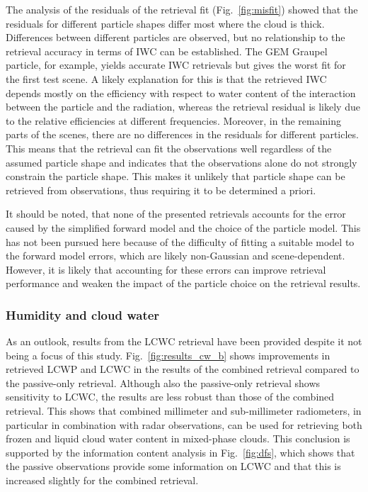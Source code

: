 \documentclass[journal abbreviation, manuscript]{copernicus}
\begin{document}
The analysis of the residuals of the retrieval fit (Fig.~\ref{fig:misfit})
showed that the residuals for different particle shapes differ most where the
cloud is thick. Differences between different particles are observed, but no
relationship to the retrieval accuracy in terms of IWC can be established. The
GEM Graupel particle, for example, yields accurate IWC retrievals but gives the
worst fit for the first test scene. A likely explanation for this is that the
retrieved IWC depends mostly on the efficiency with respect to water content of
the interaction between the particle and the radiation, whereas the retrieval
residual is likely due to the relative efficiencies at different frequencies.
Moreover, in the remaining parts of the scenes, there are no differences in the
residuals for different particles. This means that the retrieval can fit the
observations well regardless of the assumed particle shape and indicates that
the observations alone do not strongly constrain the particle shape. This 
makes it unlikely that particle shape can be retrieved from observations,
thus requiring it to be determined a priori.

It should be noted, that none of the presented retrievals accounts for the error
caused by the simplified forward model and the choice of the particle model.
This has not been pursued here because of the difficulty of fitting a suitable
model to the forward model errors, which are likely non-Gaussian and
scene-dependent. However, it is likely that accounting for these errors can
improve retrieval performance and weaken the impact of the particle choice on
the retrieval results.

\subsubsection{Humidity and cloud water}

As an outlook, results from the LCWC retrieval have been provided despite it not
being a focus of this study. Fig.~\ref{fig:results_cw_b} shows improvements in
retrieved LCWP and LCWC in the results of the combined retrieval compared to the
passive-only retrieval. Although also the passive-only retrieval shows
sensitivity to LCWC, the results are less robust than those of the combined
retrieval. This shows that combined millimeter and sub-millimeter radiometers,
in particular in combination with radar observations, can be used for retrieving
both frozen and liquid cloud water content in mixed-phase clouds. This
conclusion is supported by the information content analysis in
Fig.~\ref{fig:dfs}, which shows that the passive observations provide some
information on LCWC and that this is increased slightly for the combined retrieval.
\end{document}
